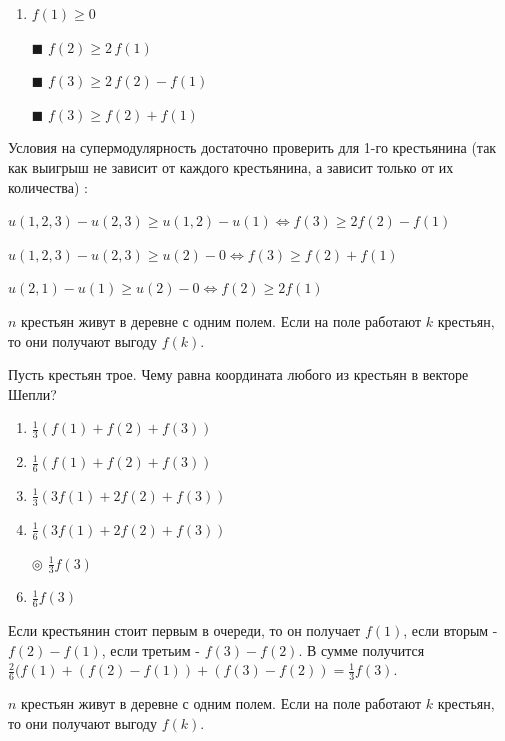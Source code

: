 	\begin{enumerate}[label=$\square$]
		\item $f(1) \geq 0$
		\item[$\blacksquare$] $f(2) \geq 2\, f(1)$
		\item[$\blacksquare$] $f(3) \geq 2\,f(2) - f(1)$
		\item[$\blacksquare$] $f(3) \geq f(2) + f(1)$
	\end{enumerate}

	\solution
	Условия на супермодулярность достаточно проверить для 1-го крестьянина (так как выигрыш не зависит от каждого крестьянина, а зависит только от их количества) :
	
	$u(1,2,3)-u(2,3) \geq u(1,2) - u(1) \Leftrightarrow f(3) \geq 2f(2)-f(1)$
	
	$u(1,2,3)-u(2,3) \geq u(2) - 0 \Leftrightarrow f(3) \geq f(2)+f(1)$
	
	$u(2,1)-u(1) \geq u(2) - 0 \Leftrightarrow f(2) \geq 2f(1)$
	
	\task
	$n$ крестьян живут в деревне с одним полем. Если на поле работают $k$ крестьян, то они получают выгоду $f(k)$.
	
	Пусть крестьян трое. Чему равна координата любого из крестьян в векторе Шепли?
	
	\begin{enumerate}[label=$\circ$]
		\item $\frac{1}{3} \left(f(1)+f(2)+f(3)\right)$ \vspace{1mm}
		\item $\frac{1}{6}\left(f(1)+f(2)+f(3)\right)$\vspace{1mm}
		\item $\frac{1}{3}(3f(1)+2f(2)+f(3))$\vspace{1mm}
		\item $\frac{1}{6}(3f(1)+2f(2)+f(3))$\vspace{1mm}
		\item[$\circledcirc$] $\frac{1}{3}f(3)$\vspace{1mm}
		\item $\frac{1}{6}f(3)$\vspace{1mm}
	\end{enumerate}

	\solution
	Если крестьянин стоит первым в очереди, то он получает $f(1)$, если вторым - $f(2)-f(1)$, если третьим - $f(3)-f(2)$. В сумме получится $\frac{2}{6}(f(1)+(f(2)-f(1))+(f(3)-f(2)) = \frac{1}{3}f(3)$.
	
	\task
	$n$ крестьян живут в деревне с одним полем. Если на поле работают $k$ крестьян, то они получают выгоду $f(k)$.
	
